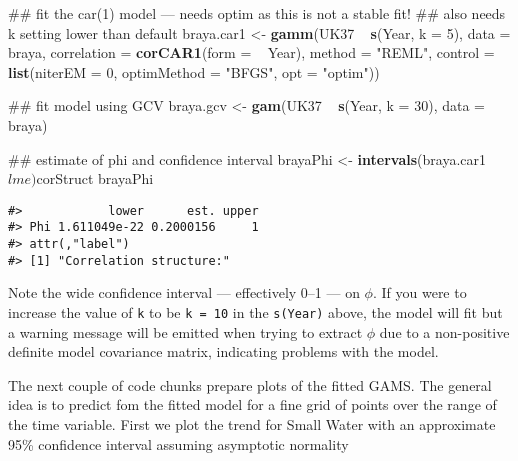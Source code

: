 \documentclass[12pt,]{article}
\newenvironment{Shaded}{\begin{snugshade}}{\end{snugshade}}
\newcommand{\KeywordTok}[1]{\textcolor[rgb]{0.13,0.29,0.53}{\textbf{{#1}}}}
\newcommand{\DataTypeTok}[1]{\textcolor[rgb]{0.13,0.29,0.53}{{#1}}}
\newcommand{\DecValTok}[1]{\textcolor[rgb]{0.00,0.00,0.81}{{#1}}}
\newcommand{\StringTok}[1]{\textcolor[rgb]{0.31,0.60,0.02}{{#1}}}
\newcommand{\NormalTok}[1]{{#1}}
\begin{document}
\begin{Shaded}
\begin{Highlighting}[]
\NormalTok{## fit the car(1) model --- needs optim as this is not a stable fit!}
\NormalTok{## also needs k setting lower than default}
\NormalTok{braya.car1 <-}\StringTok{ }\KeywordTok{gamm}\NormalTok{(UK37 ~}\StringTok{ }\KeywordTok{s}\NormalTok{(Year, }\DataTypeTok{k =} \DecValTok{5}\NormalTok{), }\DataTypeTok{data =} \NormalTok{braya, }
                   \DataTypeTok{correlation =} \KeywordTok{corCAR1}\NormalTok{(}\DataTypeTok{form =} \NormalTok{~}\StringTok{ }\NormalTok{Year),}
                   \DataTypeTok{method =} \StringTok{"REML"}\NormalTok{,}
                   \DataTypeTok{control =} \KeywordTok{list}\NormalTok{(}\DataTypeTok{niterEM =} \DecValTok{0}\NormalTok{, }\DataTypeTok{optimMethod =} \StringTok{"BFGS"}\NormalTok{, }
                                  \DataTypeTok{opt =} \StringTok{"optim"}\NormalTok{))}

\NormalTok{## fit model using GCV}
\NormalTok{braya.gcv <-}\StringTok{ }\KeywordTok{gam}\NormalTok{(UK37 ~}\StringTok{ }\KeywordTok{s}\NormalTok{(Year, }\DataTypeTok{k =} \DecValTok{30}\NormalTok{), }\DataTypeTok{data =} \NormalTok{braya)}

\NormalTok{## estimate of phi and confidence interval}
\NormalTok{brayaPhi <-}\StringTok{ }\KeywordTok{intervals}\NormalTok{(braya.car1$lme)$corStruct}
\NormalTok{brayaPhi}
\end{Highlighting}
\end{Shaded}

\begin{verbatim}
#>            lower      est. upper
#> Phi 1.611049e-22 0.2000156     1
#> attr(,"label")
#> [1] "Correlation structure:"
\end{verbatim}

Note the wide confidence interval --- effectively 0--1 --- on \(\phi\).
If you were to increase the value of \texttt{k} to be \texttt{k\ =\ 10}
in the \texttt{s(Year)} above, the model will fit but a warning message
will be emitted when trying to extract \(\phi\) due to a non-positive
definite model covariance matrix, indicating problems with the model.

The next couple of code chunks prepare plots of the fitted GAMS. The
general idea is to predict fom the fitted model for a fine grid of
points over the range of the time variable. First we plot the trend for
Small Water with an approximate 95\% confidence interval assuming
asymptotic normality
\end{document}
